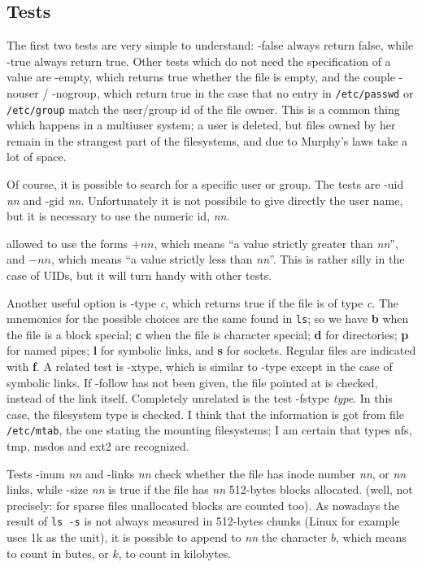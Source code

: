 \subsection{Tests}

The first two tests are very simple to understand: {\sf -false} always
return false, while {\sf -true} always return true. Other tests which
do not need the specification of a value are {\sf -empty}, which returns
true whether the file is empty, and the couple {\sf -nouser} / {\sf
-nogroup}, which return true in the case that no entry in {\tt /etc/passwd}
or {\tt /etc/group} match the user/group id of the file owner. This is a
common thing which happens in a multiuser system; a user is deleted, but
files owned by her remain in the strangest part of the filesystems, and due
to Murphy's laws take a lot of space.

Of course, it is possible to search for a specific user or group. The
tests are {\sf -uid {\sl nn}} and {\sf -gid {\sl nn}}. Unfortunately it is
not possibile to give directly the user name, but it is necessary to use
the numeric id, {\em nn}.


allowed to use the forms $+nn$, which means ``a value strictly greater
than {\em nn\/}'', and $-nn$, which means ``a value strictly less than
{\em nn\/}''. This is rather silly in the case of UIDs, but it will turn
handy with other tests.

Another useful option is {\sf -type {\em c\/}}, which returns true if the
file is of type {\em c\/}. The mnemonics for the possible choices are the
same found in {\tt ls}; so we have {\bf b} when the file is
a block special; {\bf c} when the file is character special; {\bf d} for
directories; {\bf p} for named pipes; {\bf l} for symbolic links, and {\bf
s} for sockets. Regular files are indicated with {\bf f}. A related test is
{\sf -xtype}, which is similar to -type except in the case of symbolic
links. If -follow has not been given, the file pointed at is checked,
instead of the link itself. Completely unrelated is the test {\sf
-fstype} {\em type\/}. In this case, the filesystem type is checked. I
think that the information is got from file {\tt /etc/mtab}, the one
stating the mounting filesystems; I am certain that types nfs, tmp, msdos
and ext2 are recognized.

Tests {\sf -inum {\em nn\/}} and {\sf -links {\em nn\/}} check whether the
file has inode number {\em nn\/}, or {\em nn\/} links, while {\sf -size
{\em nn\/}} is true if the file has {\em nn\/} 512-bytes blocks allocated.
(well, not precisely: for sparse files unallocated blocks are counted
too). As nowadays the result of {\tt ls -s} is not always measured in
512-bytes chunks (Linux for example uses 1k as the unit), it is possible
to append to {\em nn} the character $b$, which means to count in butes, or
$k$, to count in kilobytes.

